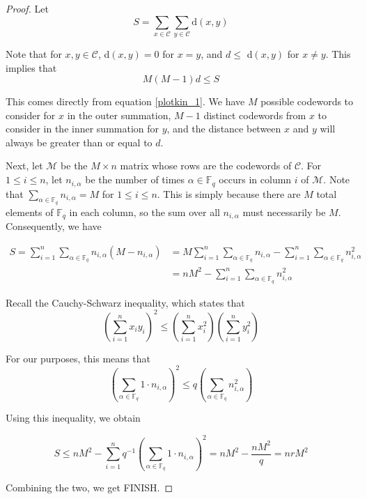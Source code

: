\documentclass{article}
\numberwithin{theorem}{subsection}
\begin{document}
\begin{proof}
Let 
\begin{equation} \label{plotkin_1}
S = \sum_{x \in \mathcal{C}} \sum_{y \in \mathcal{C}} \text{d}(x,y)
\end{equation}

Note that for $x,y \in \mathcal{C}$, d$(x,y)=0$ for $x=y$, and $d \le$ d$(x,y)$ for $x\neq y$.  This implies that
\begin{equation}
M(M-1)d\le S
\end{equation}

This comes directly from equation \ref{plotkin_1}.  We have $M$ possible codewords to consider for $x$ in the outer summation, $M-1$ distinct codewords from $x$ to consider in the inner summation for $y$, and the distance between $x$ and $y$ will always be greater than or equal to $d$.

Next, let $\mathcal{M}$ be the $M \times n$ matrix whose rows are the codewords of $\mathcal{C}$.  For $1 \le i \le n$, let $n_{i,\alpha}$ be the number of times $\alpha \in
 \mathbb{F}_q$ occurs in column $i$ of $\mathcal{M}$.  Note that $\sum_{\alpha \in \mathbb{F}_q} n_{i,\alpha} = M$ for $1\le i \le n$.  This is simply because there are $M$ total
 elements of $\mathbb{F}_q$ in each column, so the sum over all $n_{i,\alpha}$ must necessarily be $M$.  Consequently, we have

\begin{equation}
\begin{split}
S = \sum_{i=1}^{n} \sum_{\alpha\in\mathbb{F}_q} n_{i,\alpha}(M - n_{i,\alpha}) &= M\sum_{i=1}^{n} \sum_{\alpha\in\mathbb{F}_q} n_{i,\alpha} - \sum_{i=1}^{n} \sum_{\alpha\in\mathbb{F}_q} n_{i,\alpha}^2 \\
&= nM^2 - \sum_{i=1}^{n} \sum_{\alpha\in\mathbb{F}_q} n_{i,\alpha}^2
\end{split}
\end{equation}

Recall the Cauchy-Schwarz inequality, which states that 
\begin{equation}
\left(\sum_{i=1}^n x_i y_i \right )^2 \le \left(\sum_{i=1}^n x_i^2 \right ) \left(\sum_{i=1}^n y_i^2 \right )
\end{equation}

For our purposes, this means that 
\begin{equation}
\left(\sum_{\alpha\in\mathbb{F}_q} 1\cdot n_{i,\alpha} \right )^2 \le q \left(\sum_{\alpha\in\mathbb{F}_q} n_{i,\alpha}^2 \right )
\end{equation}

Using this inequality, we obtain

\begin{equation}
S \le nM^2 - \sum_{i=1}^n q^{-1} \left(\sum_{\alpha\in\mathbb{F}_q} 1\cdot n_{i,\alpha} \right )^2 = nM^2 - \frac{nM^2}{q} = nrM^2
\end{equation}

Combining the two, we get FINISH.


\end{proof}
\end{document}

